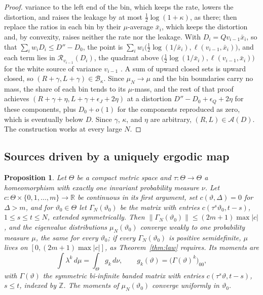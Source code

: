 \documentclass[11pt,onecolumn]{IEEEtran}
\newtheorem{proposition}[theorem]{Proposition}
\newcommand{\R}{\mathbb{R}}
\newcommand{\Z}{\mathbb{Z}}
\begin{document}
\begin{proof}
variance to the left end of the bin, which keeps the rate, lowers the
distortion, and raises the leakage by at most $\tfrac12\log(1+\kappa)$,
as there; then replace the ratios in each bin by their $\mu$-average
$\bar x_i$, which keeps the distortion and, by convexity, raises neither
the rate nor the leakage. With $D_i=Qv_{i-1}\bar x_i$, so that
$\sum_iw_iD_i\le D''-D_0$, the point is
$\sum_iw_i\bigl(\tfrac12\log(1/\bar x_i),\ell(v_{i-1},\bar x_i)\bigr)$, and
each term lies in $\mathcal R_{v_{i-1}}(D_i)$, the quadrant above
$\bigl(\tfrac12\log(1/\bar x_i),\ell(v_{i-1},\bar x_i)\bigr)$ for the white
source of variance $v_{i-1}$ \cite[Lemma~24]{part3}. A sum of upward
closed sets is upward closed, so $(R+\gamma,L+\gamma)\in\mathcal B_\kappa$. Since $\mu_N\to\mu$ and the
bin boundaries carry no mass, the share of each bin tends to its
$\mu$-mass, and the rest of that proof achieves
$(R+\gamma+\eta,L+\gamma+\epsilon_J+2\eta)$ at a distortion
$D''-D_0+\epsilon_Q+2\eta$ for these components, plus $D_0+o(1)$ for the
components reproduced as zero, which is eventually below $D$. Since
$\gamma$, $\kappa$, and $\eta$ are arbitrary, $(R,L)\in\mathcal A(D)$.
The construction works at every large $N$.
\end{proof}

\subsection{Sources driven by a uniquely ergodic map}

\begin{proposition}\label{prop:ergodic}
Let $\Theta$ be a compact metric space and $\tau:\Theta\to\Theta$ a
homeomorphism with exactly one invariant probability measure $\nu$.
Let $c:\Theta\times\{0,1,\dots,m\}\to\R$ be continuous in its first
argument, set $c(\vartheta,\Delta)=0$ for $\Delta>m$, and
for $\vartheta_0\in\Theta$ let $\Gamma_N(\vartheta_0)$ be the matrix with
entries $c(\tau^s\vartheta_0,t-s)$, $1\le s\le t\le N$, extended
symmetrically. Then $\|\Gamma_N(\vartheta_0)\|\le(2m+1)\max|c|$, and the
eigenvalue distributions $\mu_N(\vartheta_0)$ converge weakly to one
probability measure $\mu$, the same for every $\vartheta_0$; if every
$\Gamma_N(\vartheta_0)$ is positive semidefinite, $\mu$ lives on
$[0,(2m+1)\max|c|]$, as Theorem~\ref{thm:law} requires. Its moments are
\[
\int\lambda^k\,d\mu=\int_\Theta g_k\,d\nu,\qquad
g_k(\vartheta)=\bigl(\Gamma(\vartheta)^k\bigr)_{00},
\]
with $\Gamma(\vartheta)$ the symmetric bi-infinite banded matrix with
entries $c(\tau^s\vartheta,t-s)$, $s\le t$, indexed by $\Z$. The moments of
$\mu_N(\vartheta_0)$ converge uniformly in $\vartheta_0$.
\end{proposition}
\end{document}
